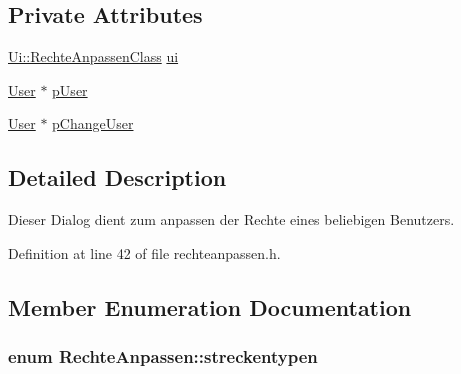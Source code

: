 \subsection*{Private Attributes}
\begin{CompactItemize}
\item 
\hyperlink{class_ui_1_1_rechte_anpassen_class}{Ui::RechteAnpassenClass} \hyperlink{class_rechte_anpassen_719e0dbae69c18a8d0f5002eba93b667}{ui}
\item 
\hyperlink{class_user}{User} $\ast$ \hyperlink{class_rechte_anpassen_edb76e8d5e19b1e27db72350a393ea0a}{pUser}
\item 
\hyperlink{class_user}{User} $\ast$ \hyperlink{class_rechte_anpassen_1a965add1d62f33e2e0c7f8c5bc414fc}{pChangeUser}
\end{CompactItemize}


\subsection{Detailed Description}
Dieser Dialog dient zum anpassen der Rechte eines beliebigen Benutzers. 

Definition at line 42 of file rechteanpassen.h.

\subsection{Member Enumeration Documentation}
\hypertarget{class_rechte_anpassen_cdf6e2c453add038a0ea629c094d07d9}{
\subsubsection[streckentypen]{\setlength{\rightskip}{0pt plus 5cm}enum {\bf RechteAnpassen::streckentypen}}}
\label{class_rechte_anpassen_cdf6e2c453add038a0ea629c094d07d9}


